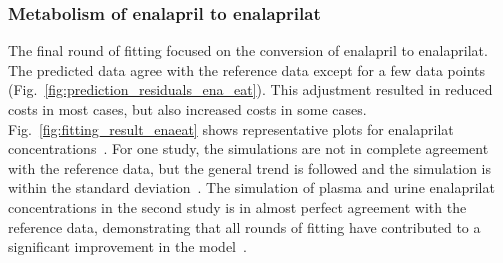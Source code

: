 \documentclass[pharmaceutics,article,submit,pdftex,moreauthors]{Definitions/mdpi}
\begin{document}
\subsubsection{Metabolism of enalapril to enalaprilat}


The final round of fitting focused on the conversion of enalapril to enalaprilat. The predicted data agree with the reference data except for a few data points (Fig.~\ref{fig:prediction_residuals_ena_eat}). This adjustment resulted in reduced costs in most cases, but also increased costs in some cases. Fig.~\ref{fig:fitting_result_enaeat} shows representative plots for enalaprilat concentrations~\cite{Ohnishi1989, Kelly1986}. For one study, the simulations are not in complete agreement with the reference data, but the general trend is followed and the simulation is within the standard deviation~\cite{Ohnishi1989}. The simulation of plasma and urine enalaprilat concentrations in the second study is in almost perfect agreement with the reference data, demonstrating that all rounds of fitting have contributed to a significant improvement in the model~\cite{Kelly1986}. 

\end{document}
